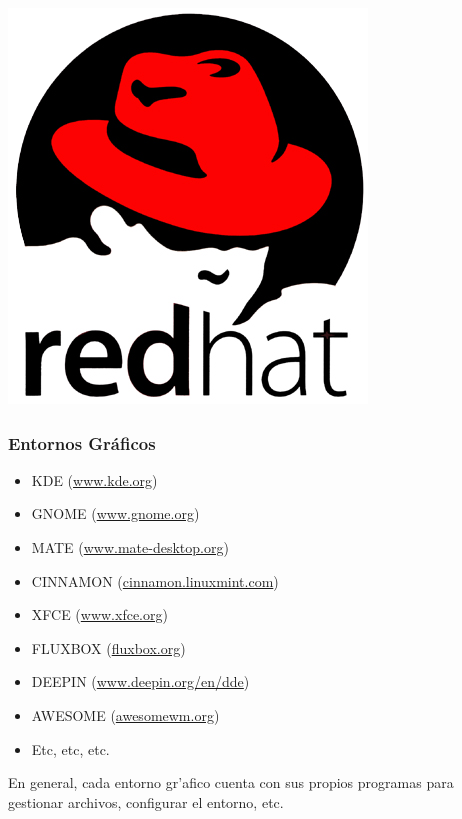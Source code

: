 \documentclass[hyperref={colorlinks}]{beamer}
\begin{document}
\begin{frame}
\begin{minipage}[b][.30\textheight][t]{.3\textwidth}
    \includegraphics[width=.7\textwidth]{figs/redhat.png}\\
    
    \end{minipage}
\end{frame}

\begin{frame}\frametitle{Entornos Gr\'aficos}
	\begin{block}{}
		\begin{itemize}
			\item KDE (\href{https://www.kde.org}{www.kde.org})
			\item GNOME (\href{https://www.gnome.org}{www.gnome.org})
			\item MATE (\href{https://www.mate-desktop.org}{www.mate-desktop.org})
			\item CINNAMON (\href{http://cinnamon.linuxmint.com}{cinnamon.linuxmint.com})
			\item XFCE (\href{https://www.xfce.org}{www.xfce.org})
			\item FLUXBOX (\href{http://fluxbox.org/}{fluxbox.org})
			\item DEEPIN (\href{https://www.deepin.org/en/dde/}{www.deepin.org/en/dde})
			\item AWESOME (\href{https://awesomewm.org/}{awesomewm.org})
			\item Etc, etc, etc. 
		\end{itemize}
	\end{block}
	\begin{block}{}
		En general, cada entorno gr'afico cuenta con sus propios programas para gestionar archivos, configurar el entorno, etc.
	\end{block}
\end{frame}
\end{document}
